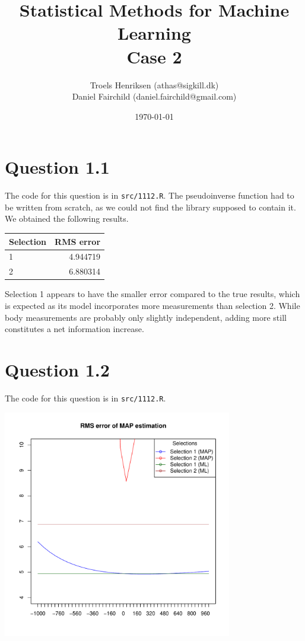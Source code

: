 \documentclass[a4paper, oneside, final]{memoir}
\title{Statistical Methods for Machine Learning\\Case 2}
\author{Troels Henriksen (athas@sigkill.dk) \\ Daniel Fairchild
  (daniel.fairchild@gmail.com)}
\date{\today}
\begin{document}
\maketitle

\section*{Question 1.1}

The code for this question is in \texttt{src/1112.R}.  The
pseudoinverse function had to be written from scratch, as we could not
find the library supposed to contain it.  We obtained the following
results.

\begin{tabular}{|l|r|}
  \textbf{Selection} & \textbf{RMS error} \\\hline
  1 & 4.944719 \\\hline
  2 & 6.880314
\end{tabular}

Selection 1 appears to have the smaller error compared to the true
results, which is expected as its model incorporates more measurements
than selection 2.  While body measurements are probably only slightly
independent, adding more still constitutes a net information increase.
\newpage
\section*{Question 1.2}

The code for this question is in \texttt{src/1112.R}.

\includegraphics[width=10cm]{img/question12-plot.pdf}
\end{document}
